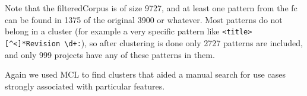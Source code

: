Note that the filteredCorpus is of size 9727, and at least one pattern from the fc can be found in 1375 of the original 3900 or whatever.  Most patterns do not belong in a cluster (for example a very specific pattern like \verb!<title>[^<]*Revision \d+:!), so after clustering is done only 2727 patterns are included, and only 999 projects have any of these patterns in them.




Again we used MCL to find clusters that aided a manual search for use cases strongly associated with particular features.











